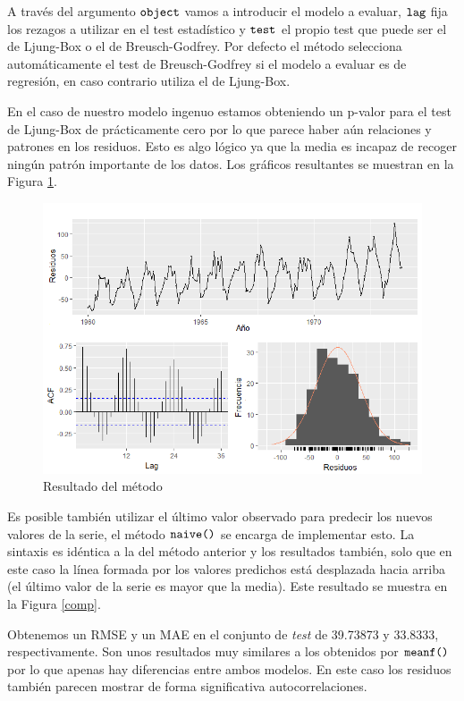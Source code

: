 A través del argumento $\verb!object!$ vamos a introducir el modelo a evaluar, $\verb!lag!$ fija los rezagos a utilizar en el test estadístico y $\verb!test!$ el propio test que puede ser el de Ljung-Box o el de Breusch-Godfrey. Por defecto el método selecciona automáticamente el test de Breusch-Godfrey si el modelo a evaluar es de regresión, en caso contrario utiliza el de Ljung-Box.

En el caso de nuestro modelo ingenuo estamos obteniendo un p-valor para el test de Ljung-Box de prácticamente cero por lo que parece haber aún relaciones y patrones en los residuos.  Esto es algo lógico ya que la media es incapaz de recoger ningún patrón importante de los datos. Los gráficos resultantes se muestran en la Figura \ref{checkresiduals}.
\begin{figure}
    \centering
    \centerline{\includegraphics[scale = 0.7]{Images/Modelizacion/37.png}}
    \caption{Resultado del método }
    \label{checkresiduals}
\end{figure}

Es posible también utilizar el último valor observado para predecir los nuevos valores de la serie, el método $\verb!naive()!$ se encarga de implementar esto. La sintaxis es idéntica a la del método anterior y los resultados también, solo que en este caso la línea formada por los valores predichos está desplazada hacia arriba (el último valor de la serie es mayor que la media). Este resultado se muestra en la Figura \ref{comp}.

Obtenemos un RMSE y un MAE en el conjunto de \textit{test} de 39.73873 y 33.8333, respectivamente. Son unos resultados muy similares a los obtenidos por $\verb!meanf()!$ por lo que apenas hay diferencias entre ambos modelos. En este caso los residuos también parecen mostrar de forma significativa autocorrelaciones.

